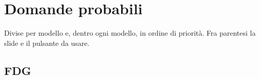 \documentclass[a4paper,10pt]{article}
\newcommand{\fr}[1]{\getrefnumber{P-#1}}      %
\begin{document}

\section*{Domande probabili}

Divise per modello e, dentro ogni modello, in ordine di priorità. Fra parentesi la slide e il pulsante da usare.

\subsection*{FDG}
\end{document}
